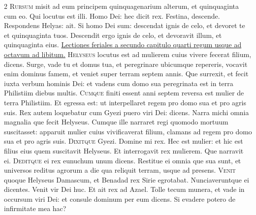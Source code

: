 \begin{multicols*}{2}
\lettrine[lines=2]{\zallmancaps \color{Red} R}{ursum} misit ad eum principem quinquagenarium alterum, et quinquaginta cum eo. Qui locutus est illi. Homo Dei: hec dicit rex. Festina, descende. Respondens Helyas: ait. Si homo Dei sum: descendat ignis de celo, et devoret te et quinquaginta tuos. Descendit ergo ignis de celo, et devoravit illum, et quinquaginta eius.
\newline \ul{Lectiones feriales a secundo capitulo quarti regum usque ad octavum ad libitum.}
{\color{Red} }
\lettrine[lines=2]{\zallmancaps \color{Blue} H}{elyseus} locutus est ad mulierem cuius vivere fecerat filium, dicens. Surge, vade tu et domus tua, et peregrinare ubicumque repereris, vocavit enim dominus famem, et veniet super terram septem annis. Que surrexit, et fecit iuxta verbum hominis Dei: et vadens cum domo sua peregrinata est in terra Philistiim diebus multis.
\lettrine[lines=2]{\zallmancaps \color{Red} C}{umque} finiti essent anni septem reversa est mulier de terra Philistiim. Et egressa est: ut interpellaret regem pro domo sua et pro agris suis. Rex autem loquebatur cum Gyezi puero viri Dei: dicens. Narra michi omnia magnalia que fecit Helyseus. Cumque ille narraret regi quomodo mortuum suscitasset: apparuit mulier cuius vivificaverat filium, clamans ad regem pro domo sua et pro agris suis.
\lettrine[lines=2]{\zallmancaps \color{Blue} D}{ixitque} Gyezi. Domine mi rex. Hec est mulier: et hic est filius eius quem suscitavit Helyseus. Et interrogavit rex mulierem. Que narravit ei.
\lettrine[lines=2]{\zallmancaps \color{Red} D}{editque} ei rex eunuchum unum dicens. Restitue ei omnia que sua sunt, et universos reditus agrorum a die qua reliquit terram, usque ad presens.
\lettrine[lines=2]{\zallmancaps \color{Blue} V}{enit} quoque Helyseus Damascum, et Benadad rex Sirie egrotabat. Nunciaveruntque ei dicentes. Venit vir Dei huc. Et ait rex ad Azael. Tolle tecum munera, et vade in occursum viri Dei: et consule dominum per eum dicens. Si evadere potero de infirmitate mea hac?

\end{multicols*}
